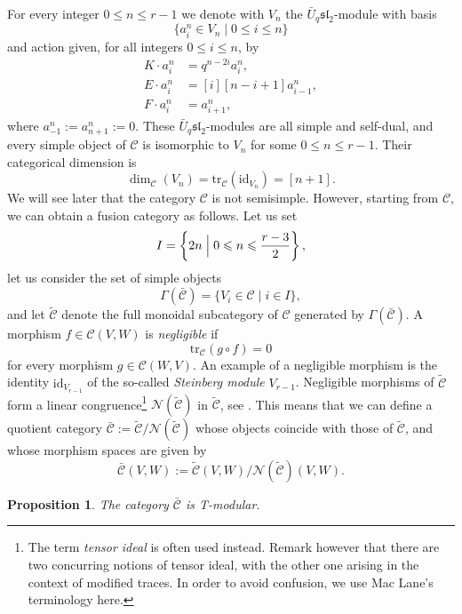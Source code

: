 \documentclass[a4paper,reqno]{amsart}
\newtheorem{proposition}[theorem]{Proposition}
\theoremstyle{definition}
\theoremstyle{remark}
\newcommand{\calC}{\mathcal{C}}
\newcommand{\calN}{\mathcal{N}}
\renewcommand{\Gamma}{\varGamma}
\newcommand{\id}{\mathrm{id}}
\newcommand{\tr}{\mathrm{tr}}
\newcommand{\leqs}{\leqslant}
\newcommand{\fsl}{\mathfrak{sl}}
\begin{document}
For every integer $0 \leqs n \leqs r-1$ we denote with $V_n$ the $\bar{U}_q \fsl_2$-module with basis 
\[
 \{ a_i^n \in V_n \mid 0 \leqs i \leqs n \}
\]
and action given, for all integers $0 \leqs i \leqs n$, by
\begin{equation*}
 \begin{split}
  K \cdot a_i^n &= q^{n-2i} a_i^n, \\
  E \cdot a_i^n &= [i][n-i+1] a_{i-1}^n, \\
  F \cdot a_i^n &= a_{i+1}^n,
 \end{split}
\end{equation*}
where $a_{-1}^n := a_{n+1}^n := 0$. These $\bar{U}_q \fsl_2$-modules are all simple and self-dual, and every simple object of $\calC$ is isomorphic to $V_n$ for some $0 \leqs n \leqs r-1$. Their categorical dimension is
\[
 \dim_\calC(V_n) = \tr_\calC(\id_{V_n}) = [n+1].
\]
We will see later that the category $\calC$ is not semisimple. However, starting from $\calC$, we can obtain a fusion category as follows. Let us set
\[
 I = \left\{ 2n \Bigm\vert 0 \leqs n \leqs \frac{r-3}{2} \right\},
\]
let us consider the set of simple objects
\[
 \Gamma(\bar{\calC}) = \{ V_i \in \calC \mid i \in I \}, 
\] 
and let $\tilde{\calC}$ denote the full monoidal subcategory of $\calC$ generated by $\Gamma(\bar{\calC})$. A morphism $f \in \calC(V,W)$ is \textit{negligible} if
\[
 \tr_\calC(g \circ f) = 0
\]
for every morphism $g \in \calC(W,V)$. An example of a negligible morphism is the identity $\id_{V_{r-1}}$ of the so-called \textit{Steinberg module} $V_{r-1}$. Negligible morphisms of $\tilde{\calC}$ form a linear congruence\footnote{The term \textit{tensor ideal} is often used instead. Remark however that there are two concurring notions of tensor ideal, with the other one arising in the context of modified traces. In order to avoid confusion, we use Mac Lane's terminology here.} $\calN(\tilde{\calC})$ in $\tilde{\calC}$, see \cite[Sec.~II.8]{M71}. This means that we can define a quotient category $\bar{\calC} := \tilde{\calC} / \calN(\tilde{\calC})$ whose objects coincide with those of $\tilde{\calC}$, and whose morphism spaces are given by
\[
 \bar{\calC}(V,W) := \tilde{\calC}(V,W)/\calN(\tilde{\calC})(V,W).
\]

\begin{proposition}
 The category $\bar{\calC}$ is T-modular.
\end{proposition}
\end{document}
